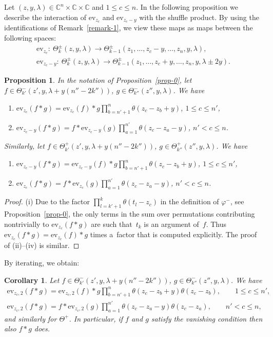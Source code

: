 \documentclass[10pt,a4paper]{amsart}
\numberwithin{equation}{section}
\newtheorem{Corollary}[Theorem]{Corollary}
\newtheorem{Proposition}[Theorem]{Proposition}
 { \theoremstyle{definition}
\newtheorem{Definition}[Theorem]{Definition}
\newtheorem{Example}[Theorem]{Example}
\newtheorem{Remark}[Theorem]{Remark} }
\begin{document}
Let $(z,y,\lambda)\in\mathbb C^n\times\mathbb C\times \mathbb C$ and $1\leq c\leq n$. In the following proposition we describe the interaction of $\mathrm{ev}_{z_c}$ and $\mathrm{ev}_{z_c-y}$ with the shuffle product. By using the identifications of Remark~\ref{remark-1}, we view these maps as maps between the following spaces:
\begin{gather*}
 \mathrm{ev}_{z_c} \colon \ \Theta^\pm_k(z,y,\lambda)\to \Theta^\pm_{k-1}(z_1,\dots,z_c-y,\dots,z_n,y,\lambda),\\
 \mathrm{ev}_{z_c-y} \colon \ \Theta^\pm_k(z,y,\lambda)\to \Theta^\pm_{k-1}(z_1,\dots,z_c+y,\dots,z_n,y,\lambda\pm 2y).
\end{gather*}
\begin{Proposition}\label{prop-ev-*} In the notation of Proposition~{\rm \ref{prop-0}}, let $f\in\Theta^-_{k'}(z',y,\lambda+y(n''-2k''))$, $g\in \Theta^-_{k''}(z'',y,\lambda)$. We have
\begin{enumerate}\itemsep=0pt
\item[$(i)$] $ \mathrm{ev}_{z_c}(f*g)= \mathrm{ev}_{z_c}(f)*g \prod\limits_{b=n'+1}^n\theta(z_c-z_b+y)$, $1\leq c\leq n'$,
\item[$(ii)$] $\mathrm{ev}_{z_c-y}(f*g)= f*\mathrm{ev}_{z_c-y}(g) \prod\limits_{a=1}^{n'}\theta(z_c-z_a-y)$, $n'<c\leq n$.
\end{enumerate}
Similarly, let $f\in\Theta^+_{k'}(z',y,\lambda+y(n''-2k''))$, $g\in \Theta^+_{k''}(z'',y,\lambda)$. We have
\begin{enumerate}\itemsep=0pt
\item[$(iii)$] $ \mathrm{ev}_{z_c-y}(f*g)= \mathrm{ev}_{z_c-y}(f)*g \prod\limits_{b=n'+1}^n\theta(z_c-z_b+y)$, $1\leq c\leq n'$,
\item[$(iv)$] $ \mathrm{ev}_{z_c}(f*g)= f*\mathrm{ev}_{z_c}(g) \prod\limits_{a=1}^{n'}\theta(z_c-z_a-y)$, $n'<c\leq n$.
\end{enumerate}
\end{Proposition}
\begin{proof} (i) Due to the factor $\prod\limits_{l=k'+1}^k\theta(t_l-z_c)$ in the definition of $\varphi^-$, see Proposition~\ref{prop-0}, the only terms in the sum over permutations contributing nontrivially to $\mathrm{ev}_{z_c}(f*g)$ are such that~$t_k$ is an argument of~$f$. Thus $\mathrm{ev}_{z_c}(f*g)=\mathrm{ev}_{z_c}(f)*g$ times a~factor that is computed explicitly. The proof of (ii)--(iv) is similar.
\end{proof}

By iterating, we obtain:
\begin{Corollary}\label{cor-3} Let $f\in\Theta^-_{k'}(z',y,\lambda+y(n''-2k''))$, $g\in \Theta^-_{k''}(z'',y,\lambda)$. We have
 \begin{gather*}
 \mathrm{ev}_{z_c,2}(f*g)= \mathrm{ev}_{z_c,2}(f)*g \prod_{b=n'+1}^n\theta(z_c-z_b+y)\theta(z_c-z_b), \qquad 1\leq c\leq n', \\
 \mathrm{ev}_{z_c,2}(f*g) = f*\mathrm{ev}_{z_c,2}(g) \prod_{a=1}^{n'}\theta(z_c-z_a-y)\theta(z_c-z_a), \qquad n'<c\leq n,
 \end{gather*}
 and similarly for $\Theta^+$.
 In particular, if $f$ and $g$ satisfy the vanishing condition then
 also $f*g$ does.
\end{Corollary}
\end{document}

